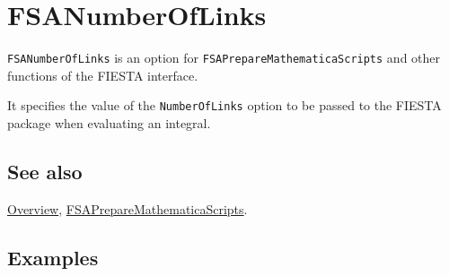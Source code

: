 \documentclass[../FeynHelpersManual.tex]{subfiles}
\begin{document}
\hypertarget{fsanumberoflinks}{
\section{FSANumberOfLinks}\label{fsanumberoflinks}}

\texttt{FSANumberOfLinks} is an option for
\texttt{FSAPrepareMathematicaScripts} and other functions of the FIESTA
interface.

It specifies the value of the \texttt{NumberOfLinks} option to be passed
to the FIESTA package when evaluating an integral.

\subsection{See also}

\hyperlink{toc}{Overview},
\hyperlink{fsapreparemathematicascripts}{FSAPrepareMathematicaScripts}.

\subsection{Examples}
\end{document}
